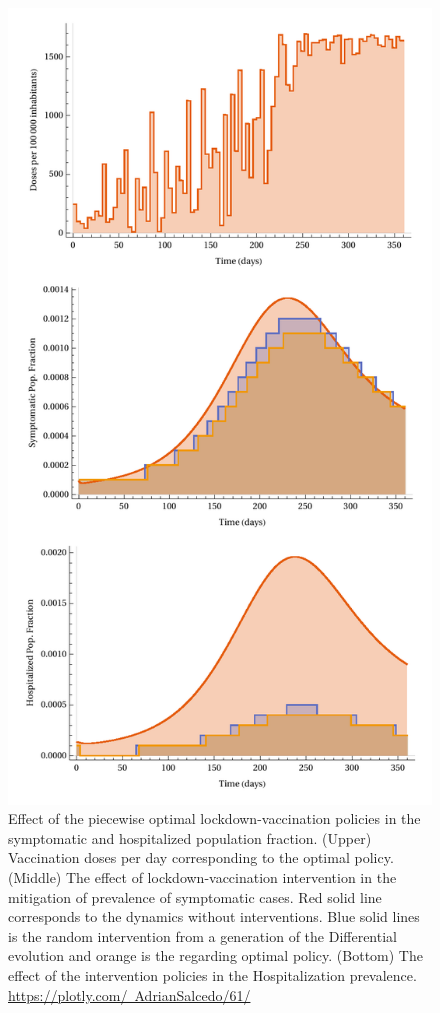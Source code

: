 \begin{figure}[tbh]
    \centering
    \includegraphics[scale=0.65, keepaspectratio]{figs/VaccinationEffect}
    \caption{
        Effect of the piecewise optimal lockdown-vaccination
        policies in the symptomatic and hospitalized population fraction.
        (Upper) Vaccination doses per day corresponding to the optimal policy.
        (Middle) The effect of lockdown-vaccination intervention in the
        mitigation of prevalence of symptomatic cases. Red solid line
        corresponds to the dynamics without interventions. Blue solid lines is
        the random intervention from a generation of the Differential evolution
        and orange is the regarding optimal policy.
        (Bottom) The effect of the intervention policies in the Hospitalization
        prevalence.
        \href{https://plotly.com/~AdrianSalcedo/61/}{%
        https://plotly.com/~AdrianSalcedo/61/}
    }
    \label{fig:vaccinationeffect}
\end{figure}
